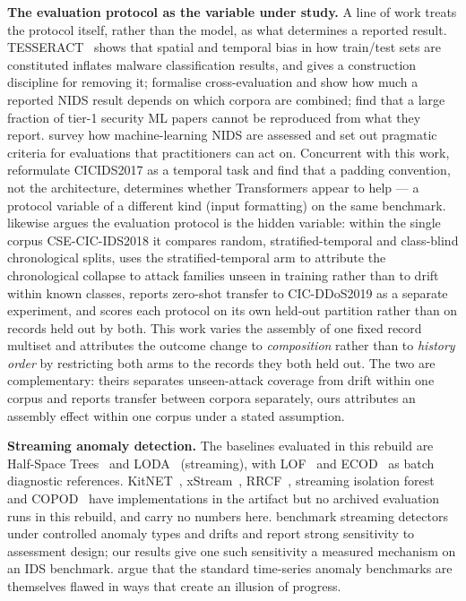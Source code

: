 \documentclass[manuscript,screen,nonacm]{acmart}
\begin{document}
\textbf{The evaluation protocol as the variable under study.} A line of work
treats the protocol itself, rather than the model, as what determines a
reported result. TESSERACT~\citep{pendlebury2019tesseract} shows that spatial
and temporal bias in how train/test sets are constituted inflates malware
classification results, and gives a construction discipline for removing it;
\citet{apruzzese2022crosseval} formalise cross-evaluation and
show how much a reported NIDS result depends on which corpora are combined;
\citet{olszewski2023reproducibility} find that a large fraction
of tier-1 security ML papers cannot be reproduced from what they report.
\citet{apruzzese2023sok} survey how
machine-learning NIDS are assessed and set out pragmatic criteria for
evaluations that practitioners can act on.
Concurrent with this work, \citet{moczkodan2026transformers}
reformulate CICIDS2017 as a temporal task and find that a padding convention,
not the architecture, determines whether Transformers appear to help --- a
protocol variable of a different kind (input formatting) on the same benchmark.
\citet{biswas2026protocol} likewise argues the evaluation protocol is the
hidden variable: within the single corpus CSE-CIC-IDS2018 it compares random,
stratified-temporal and class-blind chronological splits, uses the
stratified-temporal arm to attribute the chronological collapse to attack
families unseen in training rather than to drift within known classes, reports
zero-shot transfer to CIC-DDoS2019 as a separate experiment, and scores each
protocol on its own held-out partition rather than on records held out by
both. This work varies the assembly of one fixed record multiset and
attributes the outcome change to \emph{composition} rather than to
\emph{history order} by restricting both arms to the records they both held
out. The two are complementary: theirs separates unseen-attack coverage from
drift within one corpus and reports transfer between corpora separately, ours
attributes an assembly effect within one corpus under a stated assumption.

\textbf{Streaming anomaly detection.} The baselines evaluated in this rebuild
are Half-Space Trees~\citep{tan2011hst} and LODA~\citep{pevny2016loda}
(streaming), with LOF~\citep{breunig2000lof} and ECOD~\citep{li2023ecod} as batch
diagnostic references. KitNET~\citep{mirsky2018kitsune},
xStream~\citep{manzoor2018xstream}, RRCF~\citep{guha2016rrcf}, streaming
isolation forest~\citep{ding2013iforestasd} and COPOD~\citep{li2020copod} have
implementations in the artifact but no archived evaluation runs in this
rebuild, and carry no numbers here. \citet{cao2024revisiting}
benchmark streaming detectors under controlled anomaly types and drifts and
report strong sensitivity to assessment design; our results give one such
sensitivity a measured mechanism on an IDS benchmark. \citet{wu2023flawed} argue that the standard time-series anomaly
benchmarks are themselves flawed in ways that create an illusion of progress.
\end{document}
